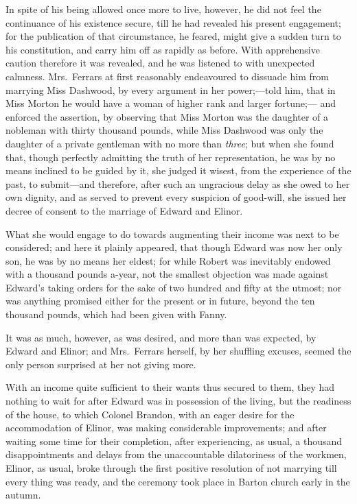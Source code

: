 In spite of his being allowed once more to live,
however, he did not feel the continuance of his existence
secure, till he had revealed his present engagement;
for the publication of that circumstance, he feared,
might give a sudden turn to his constitution, and carry
him off as rapidly as before.  With apprehensive caution
therefore it was revealed, and he was listened to with
unexpected calmness.  Mrs.\ Ferrars at first reasonably
endeavoured to dissuade him from marrying Miss Dashwood,
by every argument in her power;---told him, that in Miss Morton
he would have a woman of higher rank and larger fortune;---%
and enforced the assertion, by observing that Miss Morton
was the daughter of a nobleman with thirty thousand pounds,
while Miss Dashwood was only the daughter of a private
gentleman with no more than \emph{three}; but when she found that,
though perfectly admitting the truth of her representation,
he was by no means inclined to be guided by it,
she judged it wisest, from the experience of the past,
to submit---and therefore, after such an ungracious delay
as she owed to her own dignity, and as served to prevent
every suspicion of good-will, she issued her decree
of consent to the marriage of Edward and Elinor.

What she would engage to do towards augmenting
their income was next to be considered; and here it
plainly appeared, that though Edward was now her only son,
he was by no means her eldest; for while Robert was
inevitably endowed with a thousand pounds a-year,
not the smallest objection was made against Edward's taking
orders for the sake of two hundred and fifty at the utmost;
nor was anything promised either for the present or in future,
beyond the ten thousand pounds, which had been given with Fanny.

It was as much, however, as was desired,
and more than was expected, by Edward and Elinor;
and Mrs.\ Ferrars herself, by her shuffling excuses,
seemed the only person surprised at her not giving more.

With an income quite sufficient to their wants
thus secured to them, they had nothing to wait for
after Edward was in possession of the living, but the
readiness of the house, to which Colonel Brandon,
with an eager desire for the accommodation of Elinor,
was making considerable improvements; and after waiting
some time for their completion, after experiencing,
as usual, a thousand disappointments and delays
from the unaccountable dilatoriness of the workmen, Elinor,
as usual, broke through the first positive resolution
of not marrying till every thing was ready, and the
ceremony took place in Barton church early in the autumn.

